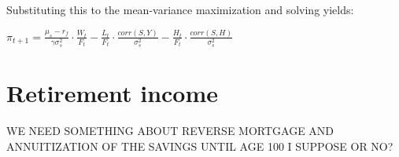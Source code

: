 Substituting this to the mean-variance maximization and solving yields:

\begin{center}
	$\pi_{t+1} = \frac{\mu_s - r_f}{\gamma \sigma^2_s} \cdot \frac{W_t}{F_t} - \frac{L_t}{F_t} \cdot \frac{corr(S,Y)}{\sigma^2_s} - \frac{H_t}{F_t} \cdot \frac{corr(S,H)}{\sigma^2_s}$
\end{center}


\section{Retirement income}
WE NEED SOMETHING ABOUT REVERSE MORTGAGE AND ANNUITIZATION OF THE SAVINGS UNTIL AGE 100 I SUPPOSE OR NO?
